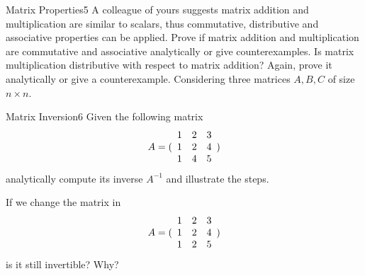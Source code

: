 \newif\ifvimbug
\vimbugfalse

\ifvimbug

\fi

 

\begin{questions}


\begin{question}{Matrix Properties}{5}
A colleague of yours suggests matrix addition and multiplication are similar to scalars, thus commutative, distributive and associative properties can be applied.
Prove if matrix addition and multiplication are commutative and associative analytically or give counterexamples. 
Is matrix multiplication distributive with respect to matrix addition? 
Again, prove it analytically or give a counterexample.
Considering three matrices $ A, B, C$ of size $n\times n$.

\begin{answer}\end{answer}

\end{question}


\begin{question}{Matrix Inversion}{6}
Given the following matrix 
\begin{equation*}
     A = ( \begin{array}{c c c} 
     1 & 2 & 3 \\
     1 & 2 & 4 \\
     1 & 4 & 5 \end{array} )
\end{equation*}
analytically compute its inverse $ A^{-1}$ and illustrate the steps.

If we change the matrix in
\begin{equation*}
     A = ( \begin{array}{c c c} 
     1 & 2 & 3 \\
     1 & 2 & 4 \\
     1 & 2 & 5 \end{array} )
\end{equation*}
is it still invertible? Why?

\begin{answer}\end{answer}

\end{question}
	

\end{questions}

